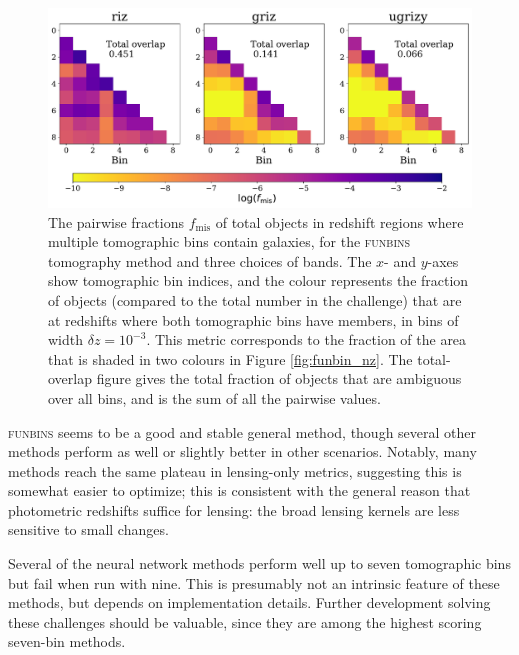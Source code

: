 \documentclass[twocolumn,twocolappendix]{aastex63}
\begin{document}
\begin{figure}[htbp]
\includegraphics[width=0.9\linewidth]{results/nzoverlap_dc2_funbins.pdf}
\caption{The pairwise fractions $f_\mathrm{mis}$ of total objects in redshift regions where multiple tomographic bins contain galaxies, for 
the \textsc{funbins} tomography method and three choices of bands.  
The $x$- and $y$-axes 
show tomographic bin indices, 
and the colour represents the fraction of objects (compared to the total number in the challenge) that are 
at redshifts where both tomographic bins have members, in bins of width $\delta z=10^{-3}$.  
This metric corresponds to
the fraction of the area that is shaded in two colours in Figure \ref{fig:funbin_nz}.
The total-overlap figure gives the total fraction of objects
that are ambiguous over all bins, and is the sum of all the pairwise values.}
\label{fig:overlap}
\end{figure}



\textsc{funbins} seems to be a good and stable general method, though several other methods perform as well
or slightly better in other scenarios.  Notably, many methods reach the same plateau in lensing-only metrics,
suggesting this is somewhat easier to optimize; this is consistent with the general reason that photometric
redshifts suffice for lensing: the broad lensing kernels are less sensitive to small changes.

Several of the neural network methods perform well up to seven tomographic bins but fail when run with 
nine.  This is presumably not an intrinsic feature of these methods, but depends on implementation details.
Further development solving these challenges should be valuable, since they are among the highest scoring seven-bin
methods.
\end{document}
